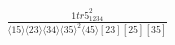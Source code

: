 \documentclass[varwidth, border=5pt]{standalone}
\begin{document}
\begin{my}
$\begin{gathered}
\scriptscriptstyle\frac{1tr5_{1234}^2}{⟨15⟩⟨23⟩⟨34⟩⟨35⟩^2⟨45⟩[23][25][35]}
\end{gathered}$
\end{my}
\end{document}
